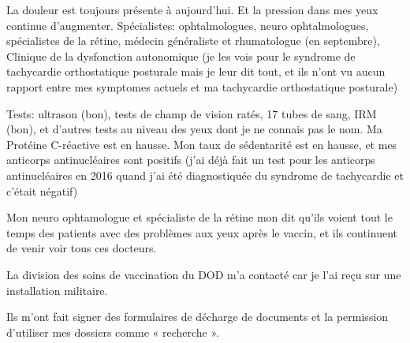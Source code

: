 {La douleur est toujours présente à aujourd'hui. Et la pression dans mes yeux
continue d'augmenter. Spécialistes: ophtalmologues, neuro ophtalmologues,
spécialistes de la rétine, médecin généraliste et rhumatologue (en septembre),
Clinique de la dysfonction autonomique (je les vois pour le syndrome de
tachycardie orthostatique posturale mais je leur dit tout, et ils n'ont vu aucun
rapport entre mes symptomes actuels et ma tachycardie orthostatique posturale)

Tests: ultrason (bon), tests de champ de vision ratés, 17 tubes de sang, IRM
(bon), et d'autres tests au niveau des yeux dont je ne connais pas le nom. Ma
Protéine C-réactive est en hausse. Mon taux de sédentarité est en hausse, et mes
anticorps antinucléaires sont positifs (j'ai déjà fait un test pour les
anticorps antinucléaires en 2016 quand j'ai été diagnostiquée du syndrome de
tachycardie et c'était négatif)

Mon neuro ophtamologue et spécialiste de la rétine mon dit qu'ils voient tout le
temps des patients avec des problèmes aux yeux après le vaccin, et ils
continuent de venir voir tous ces docteurs.

La division des soins de vaccination du DOD m'a contacté car je l'ai reçu sur
une installation militaire.

Ils m'ont fait signer des formulaires de décharge de documents et la permission
d'utiliser mes dossiers comme « recherche ».

}
